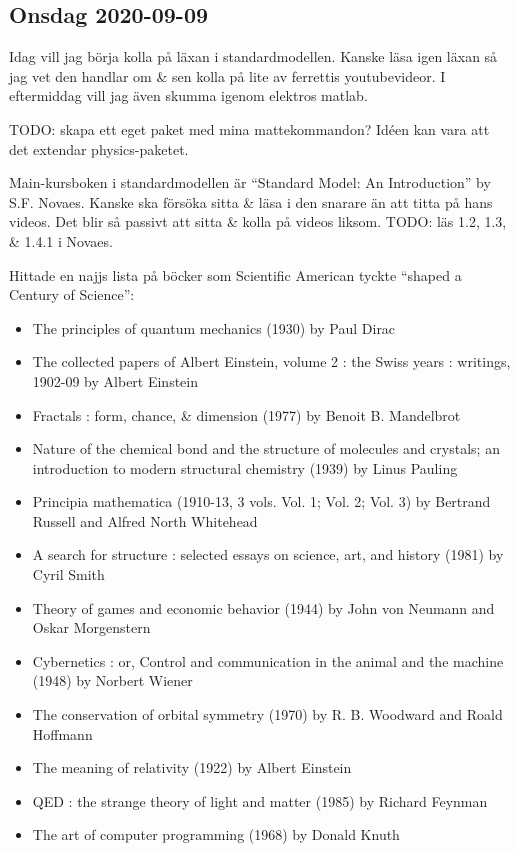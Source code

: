 \subsection{Onsdag 2020-09-09}

Idag vill jag börja kolla på läxan i standardmodellen. Kanske läsa igen läxan så jag vet den handlar om \& sen kolla på lite av ferrettis youtubevideor. I eftermiddag vill jag även skumma igenom elektros matlab.

TODO: skapa ett eget paket med mina mattekommandon? Idéen kan vara att det extendar physics-paketet.

Main-kursboken i standardmodellen är \enquote{Standard Model: An Introduction} by S.F. Novaes. Kanske ska försöka sitta \& läsa i den snarare än att titta på hans videos. Det blir så passivt att sitta \& kolla på videos liksom. TODO: läs 1.2, 1.3, \& 1.4.1 i Novaes.

\bigskip

Hittade en najjs lista på böcker som Scientific American tyckte \enquote{shaped a Century of Science}:
\begin{itemize}
	\item The principles of quantum mechanics (1930) by Paul Dirac
	\item The collected papers of Albert Einstein, volume 2 : the Swiss years : writings, 1902-09 by Albert Einstein
	\item Fractals : form, chance, \& dimension (1977) by Benoit B. Mandelbrot
	\item Nature of the chemical bond and the structure of molecules and crystals; an introduction to modern structural chemistry (1939) by Linus Pauling
	\item Principia mathematica (1910-13, 3 vols. Vol. 1; Vol. 2; Vol. 3) by Bertrand Russell and Alfred North Whitehead
	\item A search for structure : selected essays on science, art, and history (1981) by Cyril Smith
	\item Theory of games and economic behavior (1944) by John von Neumann and Oskar Morgenstern
	\item Cybernetics : or, Control and communication in the animal and the machine (1948) by Norbert Wiener
	\item The conservation of orbital symmetry (1970) by R. B. Woodward and Roald Hoffmann
	\item The meaning of relativity (1922) by Albert Einstein
	\item QED : the strange theory of light and matter (1985) by Richard Feynman
	\item The art of computer programming (1968) by Donald Knuth
\end{itemize}


